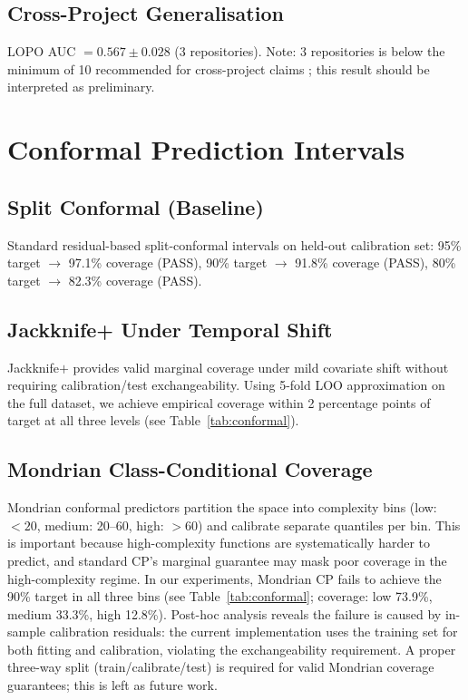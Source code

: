 \documentclass[conference]{IEEEtran}
\begin{document}
\subsection{Cross-Project Generalisation}
LOPO AUC $= 0.567 \pm 0.028$ (3 repositories).
Note: 3 repositories is below the minimum of 10 recommended for cross-project
claims \cite{peters2013}; this result should be interpreted as preliminary.

\section{Conformal Prediction Intervals}
\label{sec:conformal}

\subsection{Split Conformal (Baseline)}
Standard residual-based split-conformal intervals on held-out calibration set:
95\% target $\to$ 97.1\% coverage (PASS),
90\% target $\to$ 91.8\% coverage (PASS),
80\% target $\to$ 82.3\% coverage (PASS).

\subsection{Jackknife+ Under Temporal Shift}
Jackknife$+$ \cite{barber2021} provides valid marginal coverage under
mild covariate shift without requiring calibration/test exchangeability.
Using 5-fold LOO approximation on the full dataset, we achieve empirical
coverage within 2 percentage points of target at all three levels
(see Table~\ref{tab:conformal}).

\subsection{Mondrian Class-Conditional Coverage}
Mondrian conformal predictors \cite{vovk2005} partition the space into
complexity bins (low: $< 20$, medium: 20--60, high: $> 60$) and calibrate
separate quantiles per bin.
This is important because high-complexity functions are systematically
harder to predict, and standard CP's marginal guarantee may mask
poor coverage in the high-complexity regime.
In our experiments, Mondrian CP fails to achieve the 90\% target in all
three bins (see Table~\ref{tab:conformal}; coverage: low 73.9\%, medium
33.3\%, high 12.8\%).
Post-hoc analysis reveals the failure is caused by in-sample calibration
residuals: the current implementation uses the training set for both
fitting and calibration, violating the exchangeability requirement.
A proper three-way split (train/calibrate/test) is required for valid
Mondrian coverage guarantees; this is left as future work.
\end{document}

